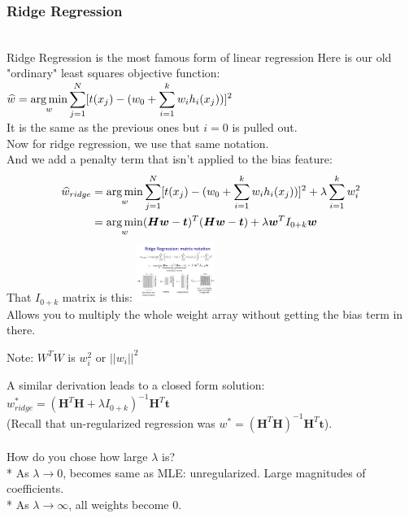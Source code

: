 \subsubsection{Ridge Regression}  \hfill \\
Ridge Regression is the most famous form of linear regression
Here is our old "ordinary" least squares objective function:   \hfill \\
$\displaystyle \widehat{w} = \operatorname*{arg\,min}_w \sum_{j=1}^N [t(x_j) - (w_0 + \sum_{i=1}^k w_i h_i(x_j))]^2$   \hfill \\
It is the same as the previous ones but $i=0$ is pulled out.    \hfill \\
Now for ridge regression, we use that same notation.  \hfill \\
And we add a penalty term that isn't applied to the bias feature:
\begin{align*}
	\widehat{w}_{ridge} &= \operatorname*{arg\,min}_w \sum_{j=1}^N [t(x_j) - (w_0 + \sum_{i=1}^k w_i h_i(x_j))]^2 + \lambda \sum_{i=1}^k w_i^2   \\
	&= \operatorname*{arg\,min}_w (\bm{H}\bm{w} - \bm{t})^T(\bm{H}\bm{w}-\bm{t}) + \lambda \bm{w}^T I_{0+k} \bm{w}
\end{align*}
That $I_{0+k}$ matrix is this: 
\includegraphics[width=1.0in]{figures/ridge_identity_matrix_with_zero.pdf}  \hfill \\
Allows you to multiply the whole weight array without getting the bias term in there. 

Note: $W^TW$ is $w_i^2$ or $|| w_i ||^2$ 

A similar derivation leads to a closed form solution:  \hfill \\
$w_{ridge}^* = (\bm{H}^T\bm{H} + \lambda I_{0+k})^{-1}\bm{H}^T\bm{t}$ \hfill \\
(Recall that un-regularized regression was $w^* = (\bm{H}^T\bm{H})^{-1}\bm{H}^T\bm{t}$).  \hfill \\   \hfill \\

How do you chose how large $\lambda$ is? \hfill \\
* As $\lambda \rightarrow 0$, becomes same as MLE: unregularized.  Large magnitudes of coefficients. \hfill \\
* As $\lambda \rightarrow \infty$, all weights become 0.  \hfill \\   \hfill \\

